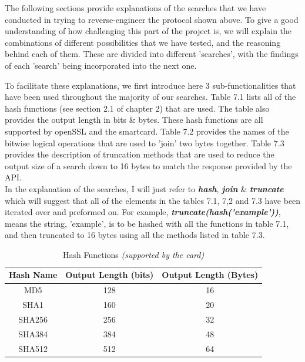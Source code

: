 \documentclass[bsc,frontabs,twoside,singlespacing,parskip,deptreport]{infthesis}     %
\begin{document}
The following sections provide explanations of the searches that we have conducted in trying to reverse-engineer the protocol shown above. To give a good understanding of how challenging this part of the project is, we will explain the combinations of different possibilities that we have tested, and the reasoning behind each of them. These are divided into different 'searches', with the findings of each 'search' being incorporated into the next one.

To facilitate these explanations, we first introduce here 3 sub-functionalities that have been used throughout the majority of our searches. Table 7.1 lists all of the hash functions (see section 2.1 of chapter 2) that are used. The table also provides the output length in bits \& bytes. These hash functions are all supported by openSSL and the smartcard. Table 7.2 provides the names of the bitwise logical operations that are used to 'join' two bytes together. Table 7.3 provides the description of truncation methods that are used to reduce the output size of a search down to 16 bytes to match the response provided by the API. \\

In the explanation of the searches, I will just refer to \textbf{\textit{hash}}, \textbf{\textit{join}} \& \textbf{\textit{truncate}} which will suggest that all of the elements in the tables 7.1, 7,2 and 7.3 have been iterated over and preformed on. For example, \textbf{\textit{truncate(hash('example'))}}, means the string, 'example', is to be hashed with all the functions in table 7.1, and then truncated to 16 bytes using all the methods listed in table 7.3.\\


\begin{table}[H]
\begin{center}
\begin{tabular}{|c|c|c|}
\hline
Hash Name & Output Length (bits) & Output Length (Bytes)\\
\hline

MD5 & 128 &16\\
SHA1 & 160 & 20\\
SHA256 & 256 & 32\\
SHA384 & 384 & 48\\
SHA512 & 512 & 64\\
\hline
\end{tabular}
\caption{Hash Functions \textit{(supported by the card)}}
\end{center}
\end{table}
\end{document}
